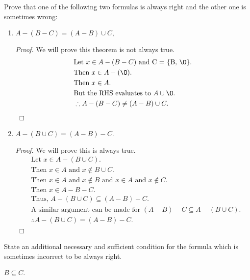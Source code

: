 \begin{question}

  \begin{subquestion}
    Prove that one of the following two formulas is always right and the other one is sometimes wrong:

    \begin{enumerate}
      \item $A - (B - C) = (A - B) \cup C$,
      \begin{proof}
        We will prove this theorem is not always true.
        \begin{align*}
          & \text{Let } x \in A - (B - C) \text{ and C = \{B, \O\}.} \\
          & \text{Then } x \in A - (\O). \\
          & \text{Then } x \in A. \\
          & \text{But the RHS evaluates to } A \cup \O. \\
          & \therefore A - (B - C) \neq (A - B) \cup C.
        \end{align*}
      \end{proof}
      \item $A - (B \cup C) = (A - B) - C$.
      \begin{proof}
        We will prove this is always true.
        \begin{align*}
          & \text{Let } x \in A - (B \cup C). \\
          & \text{Then } x \in A \text{ and } x \not \in B \cup C. \\
          & \text{Then } x \in A \text{ and } x \not \in B \text{ and } x \in A \text{ and } x \not \in C. \\
          & \text{Then } x \in A - B - C. \\
          & \text{Thus, } A - (B \cup C) \subseteq (A - B) - C. \\
          & \text{A similar argument can be made for } (A - B) - C \subseteq A - (B \cup C). \\
          & \therefore A - (B \cup C) = (A - B) - C.
        \end{align*}
      \end{proof}
    \end{enumerate}
  \end{subquestion}

  \begin{subquestion}
    State an additional necessary and sufficient condition for the formula which is sometimes incorrect to be always right.
  \end{subquestion}
  $B \subseteq C$.

\end{question}